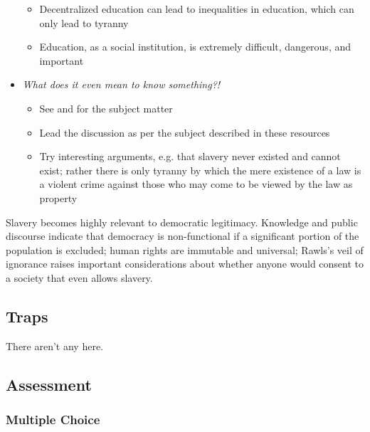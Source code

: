 \begin{itemize}
\begin{itemize}
        \item Decentralized education can lead to inequalities in education, which can only lead to tyranny

        \item Education, as a social institution, is extremely difficult, dangerous, and important
    \end{itemize}

    \item \textit{What does it even mean to know something?!}
    \begin{itemize}
        \item See  and \autocite[57-63]{Tideman2006} for the subject matter

        \item Lead the discussion as per the subject described in these resources

        \item Try interesting arguments, e.g. that slavery never existed and cannot exist; rather there is only tyranny by which the mere existence of a law is a violent crime against those who may come to be viewed by the law as property
    \end{itemize}
\end{itemize}


\begin{boxcomment}
    Slavery becomes highly relevant to democratic legitimacy.  Knowledge and public discourse indicate that democracy is non-functional if a significant portion of the population is excluded; human rights are immutable and universal; Rawls's veil of ignorance raises important considerations about whether anyone would consent to a society that even allows slavery.
\end{boxcomment}

\subsection{Traps}

There aren't any here.

\subsection{Assessment}

\subsubsection{Multiple Choice}

